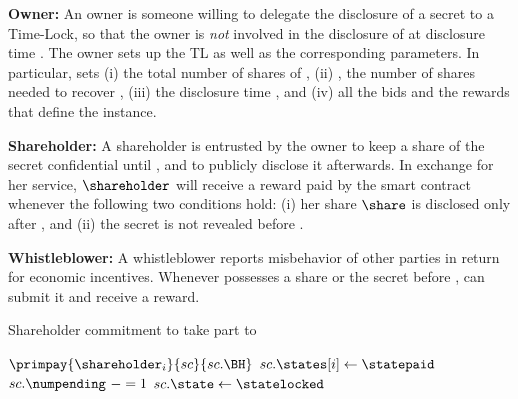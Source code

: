\begin{asparaitem}
\item {\bf Owner:}	An owner \owner is someone willing to delegate the disclosure of a secret \secret to a Time-Lock, so that the owner is \textit{not} involved in the disclosure of \secret at disclosure time \td.
The owner \owner sets up the TL as well as the corresponding parameters.
In particular, \owner sets (i) \N the total number of shares \share of \secret, (ii) \K, the number of shares needed to recover \secret, (iii) the disclosure time \td, and (iv) all the bids and the rewards that define the instance.


\item {\bf Shareholder:}
A shareholder \shareholder is entrusted by the owner \owner to keep a share \share of the secret \secret confidential until \td, and to publicly disclose it afterwards.
In exchange for her service, $\shareholder$ will receive a reward paid by the smart contract whenever the following two conditions hold: (i) her share $\share$ is disclosed only after \td, and (ii) the secret \secret is not revealed before \td.

\item {\bf Whistleblower:}
A whistleblower \whistleblower reports misbehavior of other parties in return for economic incentives.
Whenever \whistleblower possesses a share \share or the secret \secret before \td, \whistleblower can submit it and receive a reward.
\end{asparaitem}


\begin{algorithm}[t]
	\caption{Shareholder commitment to take part to \shortname}\label{algo:shareholder_commitment}
	\begin{algorithmic}[1]
		\vspace{0.6em}
		\vspace*{0.6em}
		
		\State $\primpay{\shareholder_i}{sc}{sc.\BH}$
		\State $sc.\states[i]\gets \statepaid$
		\State $sc.\numpending\ -= 1$
		\State $sc.\state\gets \statelocked$
		\EndIf
		\EndIf
		\EndIf
		\EndProcedure
	\end{algorithmic}
\end{algorithm}


